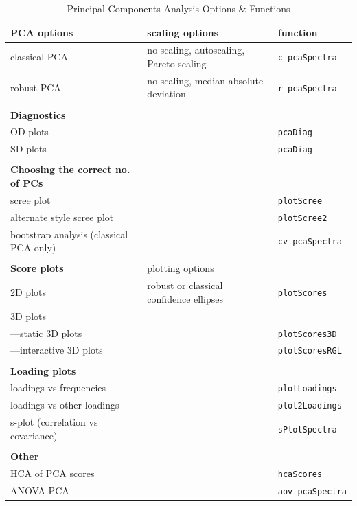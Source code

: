 \documentclass[letter,10pt,twocolumn,twoside,printwatermark=false]{pinp}
\begin{document}
\begin{table}
\caption{Principal Components Analysis Options \& Functions}
\label{opt}
\begin{center}
\begin{tabular}{|ll|l|}
\hline
\textbf{PCA options} & scaling options & function\\
\hline
classical PCA &  no scaling, autoscaling, Pareto scaling & \texttt{c\_pcaSpectra} \\
robust PCA & no scaling, median absolute deviation & \texttt{r\_pcaSpectra} \\
&&\\
\textbf{Diagnostics} &  & \\
\hline
OD plots & & \texttt{pcaDiag} \\
SD plots & & \texttt{pcaDiag}\\
&&\\
\textbf{Choosing the correct no. of PCs} & & \\
\hline
scree plot & & \texttt{plotScree}\\
alternate style scree plot & & \texttt{plotScree2}\\
bootstrap analysis (classical PCA only) & & \texttt{cv\_pcaSpectra} \\
&&\\

\textbf{Score plots} & plotting options &  \\
\hline
2D plots & robust or classical confidence ellipses & \texttt{plotScores} \\
3D plots && \\
---static 3D plots & & \texttt{plotScores3D}\\
---interactive 3D plots & & \texttt{plotScoresRGL}\\
&&\\
\textbf{Loading plots} & & \\
\hline
loadings vs frequencies & & \texttt{plotLoadings} \\
loadings vs other loadings & & \texttt{plot2Loadings} \\
s-plot (correlation vs covariance) & & \texttt{sPlotSpectra} \\
&&\\
\hline
\textbf{Other} &&\\
HCA of PCA scores & & \texttt{hcaScores} \\
ANOVA-PCA & & \texttt{aov\_pcaSpectra} \\
\hline
\end{tabular}
\end{center}
\end{table}
\end{document}
